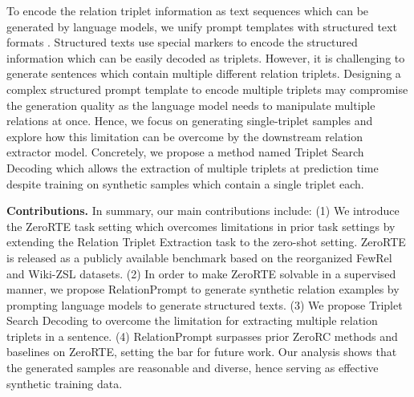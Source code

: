 \documentclass[11pt]{article}
\begin{document}
To encode the relation triplet information as text sequences which can be generated by language models, we unify prompt templates with structured text formats \cite{paolini2020structured}.
Structured texts use special markers to encode the structured information which can be easily decoded as triplets. 
However, it is challenging to generate sentences which contain multiple different relation triplets.
Designing a complex structured prompt template to encode multiple triplets may compromise the generation quality as the language model needs to manipulate multiple relations at once.
Hence, we focus on generating single-triplet samples and explore how this limitation can be overcome by the downstream relation extractor model.
Concretely, we propose a method named Triplet Search Decoding which allows the extraction of multiple triplets at prediction time despite training on synthetic samples which contain a single triplet each.









\textbf{Contributions.} In summary, our main contributions include:
(1) We introduce the ZeroRTE task setting which overcomes limitations in prior task settings by extending the Relation Triplet Extraction task to the zero-shot setting. ZeroRTE is released as a publicly available benchmark based on the reorganized FewRel \cite{han2018fewrel} and Wiki-ZSL \cite{chen2021zs} datasets.
(2) In order to make ZeroRTE solvable in a supervised manner, we propose RelationPrompt to generate synthetic relation examples by prompting language models to generate structured texts.
(3) We propose Triplet Search Decoding to overcome the limitation for extracting multiple relation triplets in a sentence.
(4) RelationPrompt surpasses prior ZeroRC methods and baselines on ZeroRTE, setting the bar for future work.
Our analysis shows that the generated samples are reasonable and diverse, hence serving as effective synthetic training data.
\end{document}
